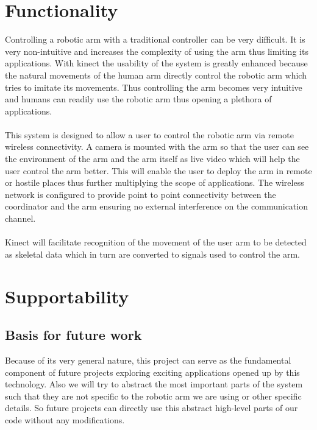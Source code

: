 \documentclass[a4wide]{scrreprt}
\begin{document}
\section{Functionality}
\indent Controlling a robotic arm with a traditional controller can be very difficult. It is very non-intuitive and increases the complexity of using the arm thus limiting its applications. With kinect the usability of the system is greatly enhanced because the natural movements of the human arm directly control the robotic arm which tries to imitate its movements. Thus controlling the arm becomes very intuitive and humans can readily use the robotic arm thus opening a plethora of applications.
\\\\
\indent This system is designed to allow a user to control the robotic arm via remote wireless connectivity. A camera is mounted with the arm so that the user can see the environment of the arm and the arm itself as live video which will help the user control the arm better. This will enable the user to deploy the arm in remote or hostile places thus further multiplying the scope of applications. The wireless network is configured to provide point to point connectivity between the coordinator and the arm ensuring no external interference on the communication channel. 
\\\\
\indent Kinect will facilitate recognition of the movement of the user arm to be detected as skeletal data which in turn are converted to signals used to control the arm.


\section{Supportability}

\subsection{Basis for future work}
\indent Because of its very general nature, this project can serve as the fundamental component of future projects exploring exciting applications opened up by this technology. Also we will try to abstract the most important parts of the system such that they are not specific to the robotic arm we are using or other specific details. So future projects can directly use this abstract high-level parts of our code without any modifications.
\end{document}
